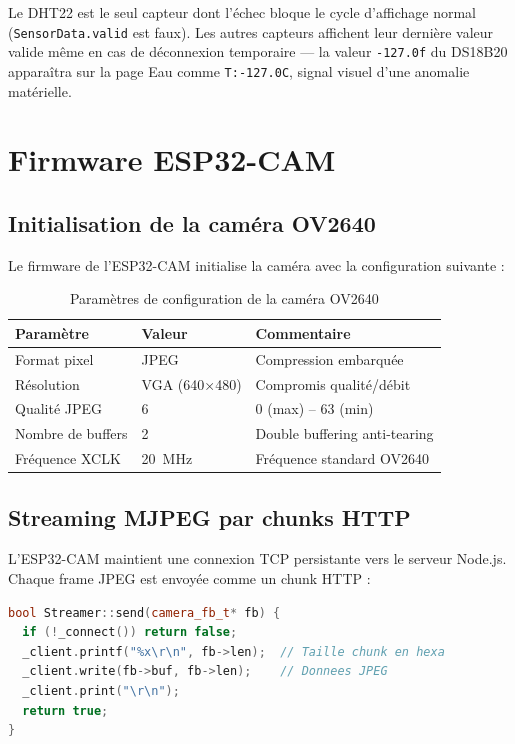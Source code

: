 \documentclass[12pt,a4paper]{report}
\newcommand{\code}[1]{\texttt{\small\colorbox{codebg}{#1}}}
\begin{document}
\begin{infobox}
Le DHT22 est le seul capteur dont l'échec bloque le cycle d'affichage normal
(\code{SensorData.valid} est faux). Les autres capteurs affichent leur dernière
valeur valide même en cas de déconnexion temporaire --- la valeur \code{-127.0f}
du DS18B20 apparaîtra sur la page Eau comme \code{T:-127.0C}, signal visuel
d'une anomalie matérielle.
\end{infobox}

\section{Firmware ESP32-CAM}

\subsection{Initialisation de la caméra OV2640}

Le firmware de l'ESP32-CAM initialise la caméra avec la configuration suivante :

\begin{table}[H]
\centering
\caption{Paramètres de configuration de la caméra OV2640}
\label{tab:camera}
\begin{tabularx}{\textwidth}{@{}L{5cm}L{3cm}L{6cm}@{}}
\toprule
\textbf{Paramètre} & \textbf{Valeur} & \textbf{Commentaire} \\
\midrule
Format pixel & JPEG & Compression embarquée \\
Résolution & VGA (640×480) & Compromis qualité/débit \\
Qualité JPEG & 6 & 0 (max) -- 63 (min) \\
Nombre de buffers & 2 & Double buffering anti-tearing \\
Fréquence XCLK & 20~MHz & Fréquence standard OV2640 \\
\bottomrule
\end{tabularx}
\end{table}

\subsection{Streaming MJPEG par chunks HTTP}

L'ESP32-CAM maintient une connexion TCP persistante vers le serveur Node.js.
Chaque frame JPEG est envoyée comme un chunk HTTP :

\begin{lstlisting}[language=C++,caption={Envoi d'une frame en chunked -- streamer.cpp}]
bool Streamer::send(camera_fb_t* fb) {
  if (!_connect()) return false;
  _client.printf("%x\r\n", fb->len);  // Taille chunk en hexa
  _client.write(fb->buf, fb->len);    // Donnees JPEG
  _client.print("\r\n");
  return true;
}
\end{lstlisting}
\end{document}
